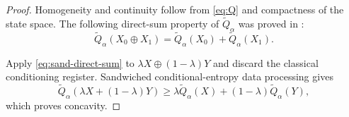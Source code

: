 \documentclass[11pt,reqno]{amsart}
\theoremstyle{definition}
\newcommand{\B}{\mathsf{B}}
\newcommand{\sand}{\widetilde}
\begin{document}
\begin{proof}
Homogeneity and continuity follow from \cref{eq:Q} and compactness of the
state space.  
The following direct-sum property of $\sand Q_{\alpha}$ was proved in  \cite{MDS+13, TBH14}:
\begin{equation}
 \sand Q_{\alpha}(X_0\oplus X_1)
 =\sand Q_{\alpha}(X_0)+\sand Q_{\alpha}(X_1).
 \label{eq:sand-direct-sum}
\end{equation}


Apply \cref{eq:sand-direct-sum} to
$\lambda X\oplus(1-\lambda)Y$ and discard the classical conditioning
register.  Sandwiched conditional-entropy data processing gives
\[
 \sand Q_{\alpha}(\lambda X+(1-\lambda)Y)
 \geq
 \lambda\sand Q_{\alpha}(X)
 +(1-\lambda)\sand Q_{\alpha}(Y),
\]
which proves concavity.
\end{proof}
\end{document}
